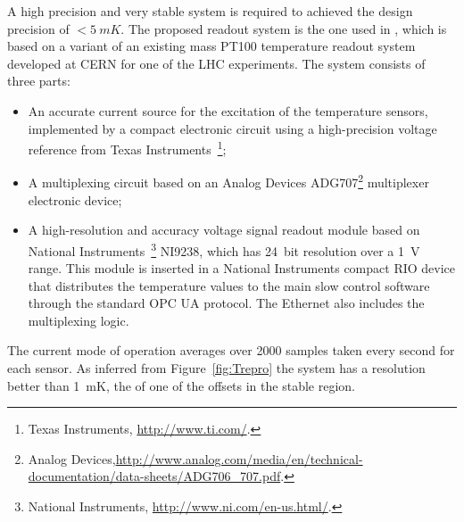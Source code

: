 A high precision and very stable system is required to achieved the design precision of $<\SI{5}{mK}$.
The proposed readout system is the one used in , which is based on a variant of an existing mass PT100 temperature readout system developed at
CERN for one of the LHC experiments. The system consists of three parts:
\begin{itemize}
\item An accurate current source for the excitation of the temperature sensors, implemented by a compact electronic circuit using a high-precision voltage reference from Texas Instruments~\footnote{Texas Instruments\texttrademark{}, \url{http://www.ti.com/}.};
\item A multiplexing circuit based on an Analog Devices ADG707\footnote{Analog Devices\texttrademark{},\url{http://www.analog.com/media/en/technical-documentation/data-sheets/ADG706_707.pdf}.} multiplexer electronic device;
\item A high-resolution and accuracy voltage signal readout module based on National Instruments~\footnote{National Instruments\texttrademark{}, \url{http://www.ni.com/en-us.html/}.} NI9238, which has \SI{24}{bit} resolution over a \SI{1}{V} range.
  This module is inserted in a National Instruments compact RIO device that distributes the temperature values to the main slow control software
  through the standard OPC UA protocol. The Ethernet  also includes the multiplexing logic.
\end{itemize}


The current mode of operation averages over \num{2000} samples taken every second for each sensor. 
As inferred from Figure~\ref{fig:Trepro} the system has a resolution better than
\SI{1}{mK}, the \rms of one of the offsets in the stable region.

